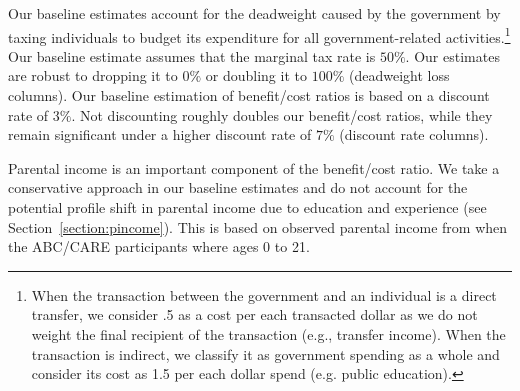 Our baseline estimates account for the deadweight caused by the government by taxing individuals to budget its expenditure for all government-related activities.\footnote{When the transaction between the government and an individual is a direct transfer, we consider .5 as a cost per each transacted dollar as we do not weight the final recipient of the transaction (e.g., transfer income). When the transaction is indirect, we classify it as government spending as a whole and consider its cost as 1.5 per each dollar spend (e.g. public education).} Our baseline estimate assumes that the marginal tax rate is $50\%$. Our estimates are robust to dropping it to $0\%$ or doubling it to $100\%$ (deadweight loss columns). Our baseline estimation of benefit/cost ratios is based on a discount rate of $3\%$. Not discounting roughly doubles our benefit/cost ratios, while they remain significant under a higher discount rate of $7\%$ (discount rate columns).

Parental income is an important component of the benefit/cost ratio. We take a conservative approach in our baseline estimates and do not account for the potential profile shift in parental income due to education and experience (see Section~\ref{section:pincome}). This is based on observed parental income from when the ABC/CARE participants where ages 0 to 21.

